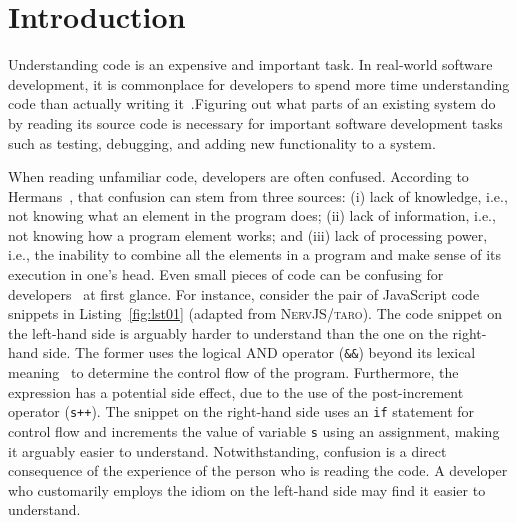 \section{Introduction}
\label{intro}




Understanding code is an expensive and important task. In real-world software development, it is commonplace for developers to spend more time understanding code than actually writing it~\cite{CitationRequired}.Figuring out what parts of an existing system do by reading its source code is necessary for important software development tasks such as testing, debugging, and adding new functionality to a system. 

When reading unfamiliar code, developers are often confused. According to Hermans~\cite{ProgrammersBrain}, that confusion can stem from three sources: (i) lack of knowledge, i.e., not knowing what an element in the program does; (ii) lack of information, i.e., not knowing how a program element works; and (iii) lack of processing power, i.e., the inability to combine all the elements in a program and make sense of its execution in one's head. Even small pieces of code can be confusing for developers~\cite{Ajami:2017:SPI,DBLP:conf/sigsoft/GopsteinIYDZYC17} at first glance. For instance, consider the pair of JavaScript code snippets in Listing~\ref{fig:lst01} (adapted from \textsc{NervJS/taro}). The code snippet on the left-hand side is arguably harder to understand than the one on the right-hand side. The former uses the logical AND operator (\texttt{\&\&}) beyond its lexical meaning~\cite{VEM2018} to determine the control flow of the program. Furthermore, the expression has a potential side effect, due to the use of the post-increment operator (\texttt{s++}). The snippet on the right-hand side uses an \texttt{if} statement for control flow and increments the value of variable \texttt{s} using an assignment, making it arguably easier to understand. Notwithstanding, confusion is a direct consequence of the experience of the person who is reading the code. A developer who customarily employs the idiom on the left-hand side may find it easier to understand. 

